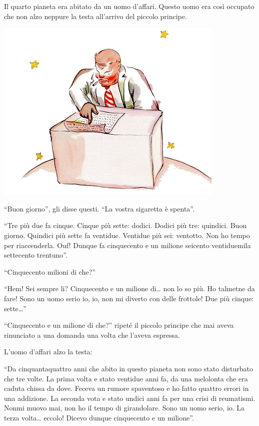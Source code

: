 \documentclass[11pt]{scrbook}
\begin{document}
Il quarto pianeta era abitato da un uomo d'affari. Questo uomo era così
occupato che non alzo neppure la testa all'arrivo del piccolo principe.

\begin{center}
\includegraphics{img/13a}
\end{center}

``Buon giorno'', gli disse questi. ``La vostra sigaretta è spenta''.

``Tre più due fa cinque. Cinque più sette: dodici. Dodici più tre:
quindici. Buon giorno. Quindici più sette fa ventidue. Ventidue più sei:
ventotto. Non ho tempo per riaccenderla. Ouf! Dunque fa cinquecento e un
milione seicento ventiduemila settecento trentuno''.

``Cinquecento milioni di che?''

``Hem! Sei sempre li? Cinquecento e un milione di\ldots{} non lo so più.
Ho talmetne da fare! Sono un uomo serio io, io, non mi diverto con delle
frottole! Due più cinque: sette\ldots{}''

``Cinquecento e un milione di che?'' ripeté il piccolo principe che mai
aveva rinunciato a una domanda una volta che l'aveva espressa.

L'uomo d'affari alzo la testa:

``Da cinquantaquattro anni che abito in questo pianeta non sono stato
disturbato che tre volte. La prima volta e stato ventidue anni fa, da
una melolonta che era caduta chissa da dove. Feceva un rumore spaventoso
e ho fatto quattro errori in una addizione. La seconda vota e stato
undici anni fa per una crisi di reumatismi. Nonmi muovo mai, non ho il
tempo di girandolare. Sono un uomo serio, io. La terza volta\ldots{}
eccolo! Dicevo dunque cinquecento e un milione''.
\end{document}
